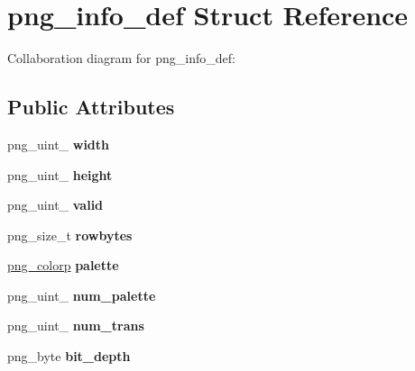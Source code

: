 \hypertarget{structpng__info__def}{\section{png\+\_\+info\+\_\+def Struct Reference}
\label{structpng__info__def}
}


Collaboration diagram for png\+\_\+info\+\_\+def\+:
\subsection*{Public Attributes}
\begin{DoxyCompactItemize}
\item 
\hypertarget{structpng__info__def_ac487ded925efc3985d1f6f873d2f2014}{png\+\_\+uint\+\_ {\bfseries width}}\label{structpng__info__def_ac487ded925efc3985d1f6f873d2f2014}

\item 
\hypertarget{structpng__info__def_ade3d79dce8b63cbfdd6150c4c30e51f4}{png\+\_\+uint\+\_ {\bfseries height}}\label{structpng__info__def_ade3d79dce8b63cbfdd6150c4c30e51f4}

\item 
\hypertarget{structpng__info__def_a8695fb4fae2b7d0c8a5be4f4c563aa8a}{png\+\_\+uint\+\_ {\bfseries valid}}\label{structpng__info__def_a8695fb4fae2b7d0c8a5be4f4c563aa8a}

\item 
\hypertarget{structpng__info__def_ad8db9ce83eb9f443fddd006a2d0d6589}{png\+\_\+size\+\_\+t {\bfseries rowbytes}}\label{structpng__info__def_ad8db9ce83eb9f443fddd006a2d0d6589}

\item 
\hypertarget{structpng__info__def_af032d4977f69766baf6ed147abc5ee27}{\hyperlink{structpng__color__struct}{png\+\_\+colorp} {\bfseries palette}}\label{structpng__info__def_af032d4977f69766baf6ed147abc5ee27}

\item 
\hypertarget{structpng__info__def_aa7b651d53768b70da1910bf750ddb341}{png\+\_\+uint\+\_ {\bfseries num\+\_\+palette}}\label{structpng__info__def_aa7b651d53768b70da1910bf750ddb341}

\item 
\hypertarget{structpng__info__def_ac088b6ab245f61f474ba56a66ec7e787}{png\+\_\+uint\+\_ {\bfseries num\+\_\+trans}}\label{structpng__info__def_ac088b6ab245f61f474ba56a66ec7e787}

\item 
\hypertarget{structpng__info__def_a437ea0466fea89c1794a8e3aa8d4da9e}{png\+\_\+byte {\bfseries bit\+\_\+depth}}\label{structpng__info__def_a437ea0466fea89c1794a8e3aa8d4da9e}


\end{DoxyCompactItemize}
